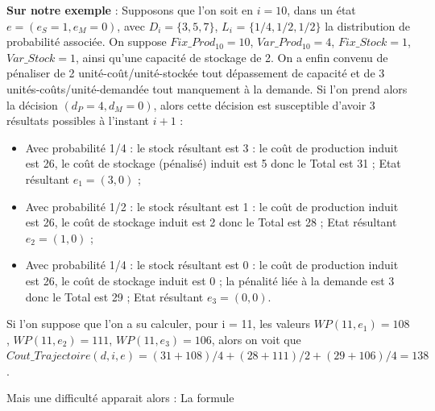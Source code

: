 \textbf{Sur notre exemple} : Supposons que l'on soit en $i = 10$, dans un état $e =  (e_S = 1, e_M = 0)$, avec $D_i = \{3, 5, 7\}$, $L_i$ = $\{1/4, 1/2, 1/2\}$ la distribution de probabilité associée. On suppose  $Fix\_Prod_{10} = 10$, $Var\_Prod_{10} = 4$,  $Fix\_Stock = 1$, $Var\_Stock = 1$, ainsi qu'une capacité de stockage de 2. On a enfin convenu de pénaliser de 2 unité-coût/unité-stockée tout dépassement de capacité et de 3 unités-coûts/unité-demandée tout manquement à la demande. Si l'on prend alors la décision $(d_P = 4, d_M = 0)$, alors cette décision est susceptible d'avoir 3 résultats possibles à l'instant $i+1$ :
\begin{itemize}[label=$\square$]
	\item	Avec probabilité 1/4 : le stock résultant est 3 : le coût de production induit est 26, le coût de stockage (pénalisé) induit est 5 donc le Total est 31 ; Etat résultant $e_1 = (3, 0)$ ;
	\item	 Avec probabilité 1/2  : le stock résultant est 1 : le coût de production induit est 26, le coût de stockage induit est 2 donc le Total est 28 ; Etat résultant $e_2 = (1, 0)$ ;
	\item	Avec probabilité 1/4 : le stock résultant est 0 : le coût de production induit est 26, le coût de stockage induit est 0 ; la pénalité liée à la demande est 3 donc le Total est 29 ; Etat résultant $e_3 =  (0, 0)$.
\end{itemize}

Si l'on suppose que l'on a su calculer, pour i = 11, les valeurs $WP(11, e_1) = 108$,  $WP(11, e_2) = 111$, $WP(11, e_3) = 106$, alors on voit que $Cout\_Trajectoire(d, i, e) =  (31 + 108)/4 + (28+111)/2 + (29 + 106)/4 =  138$.

Mais une difficulté apparait alors :  La formule 

